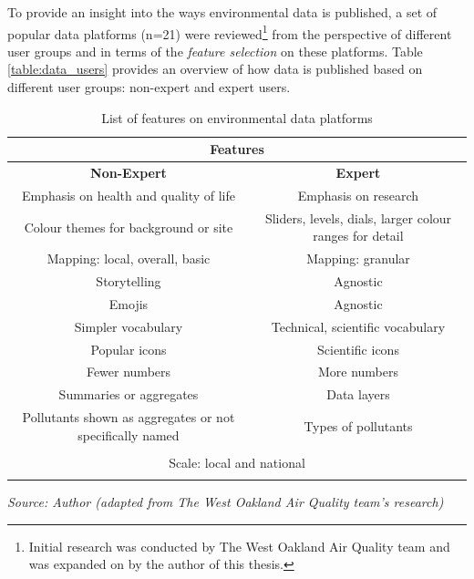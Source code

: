 To provide an insight into the ways environmental data is published, a set of popular data platforms (n=21) were reviewed\footnote{Initial research was conducted by The West Oakland Air Quality team and was expanded on by the author of this thesis.} from the perspective of different user groups and in terms of the \textit{feature selection} on these platforms. Table \ref{table:data_users} provides an overview of how data is published based on different user groups: non-expert and expert users.

\begin{table}[hbt!]
\scriptsize
\centering
\begin{tabular}{|c|c|}
\hline
    \multicolumn{2}{|c|}{\textbf{Features}} \\ [0.5ex]
\hline
    \textbf{Non-Expert} & \textbf{Expert} \\ [0.5ex]
\hline
\rowcolor[gray]{.9} Emphasis on health and quality of life & Emphasis on research \\
\hline
Colour themes for background or site & Sliders, levels, dials, larger colour ranges for detail \\ 
\hline
\rowcolor[gray]{.9} Mapping: local, overall, basic & Mapping: granular \\
\hline
Storytelling & Agnostic \\ 
\hline
\rowcolor[gray]{.9} Emojis & Agnostic \\ 
\hline
Simpler vocabulary & Technical, scientific vocabulary \\ 
\hline
\rowcolor[gray]{.9} Popular icons & Scientific icons \\ 
\hline
Fewer numbers & More numbers \\ 
\hline
\rowcolor[gray]{.9} Summaries or aggregates & Data layers \\
\hline
Pollutants shown as aggregates or not specifically named & Types of pollutants \\ 
\hline
\rowcolor[gray]{.9}\multicolumn{2}{|c|}{Charts } \\ 
\hline
\multicolumn{2}{|c|}{Scale: local and national} \\
\hline
\rowcolor[gray]{.9}\multicolumn{2}{|c|}{Search} \\ [0.5ex]
\hline
\end{tabular}

\smallskip\centering
    \footnotesize\emph{Source: Author (adapted from The West Oakland Air Quality team's research)}
\caption[City Data Platform's Features]{List of features on environmental data platforms}
\label{table:data_features}
\end{table}

